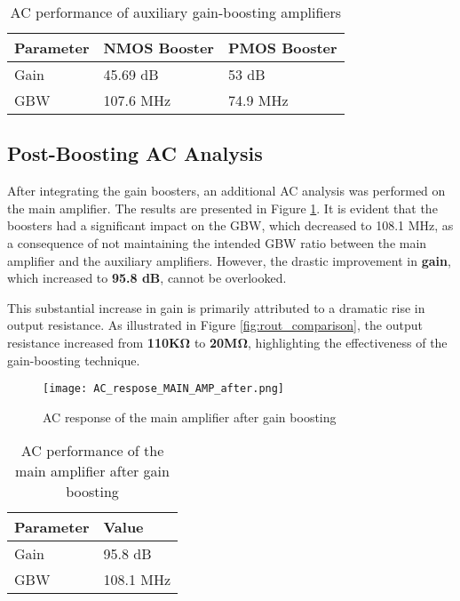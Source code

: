 \documentclass[a4paper,12pt]{article}
\begin{document}
\begin{table}[h]
    \centering
    \begin{tabular}{lll}
        \toprule
        Parameter & NMOS Booster & PMOS Booster \\
        \midrule
        Gain & 45.69 dB & 53 dB \\
        GBW & 107.6 MHz & 74.9 MHz \\
        \bottomrule
    \end{tabular}
    \caption{AC performance of auxiliary gain-boosting amplifiers}
    \label{tab:ac_aux}
\end{table}
\subsection{Post-Boosting AC Analysis}
After integrating the gain boosters, an additional AC analysis was performed on the main amplifier. The results are presented in Figure \ref{fig:ac_main_after}. It is evident that the boosters had a significant impact on the GBW, which decreased to 108.1 MHz, as a consequence of not maintaining the intended GBW ratio between the main amplifier and the auxiliary amplifiers. However, the drastic improvement in \textbf{gain}, which increased to \textbf{95.8 dB}, cannot be overlooked.

This substantial increase in gain is primarily attributed to a dramatic rise in output resistance. As illustrated in Figure \ref{fig:rout_comparison}, the output resistance increased from \textbf{110KΩ} to \textbf{20MΩ}, highlighting the effectiveness of the gain-boosting technique.

\begin{figure}[h]
    \centering
    \texttt{[image: AC\_respose\_MAIN\_AMP\_after.png]}
    \caption{AC response of the main amplifier after gain boosting}
    \label{fig:ac_main_after}
\end{figure}

\begin{table}[H]
    \centering
    \begin{tabular}{ll}
        \toprule
        Parameter & Value \\
        \midrule
        Gain & 95.8 dB \\
        GBW & 108.1 MHz \\
        \bottomrule
    \end{tabular}
    \caption{AC performance of the main amplifier after gain boosting}
    \label{tab:ac_main_after}
\end{table}
\end{document}
